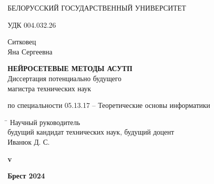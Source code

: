 \begin{titlepage}

    \begin{center} \bfseries
        \bigskip
        \medskip

        {БЕЛОРУССКИЙ ГОСУДАРСТВЕННЫЙ УНИВЕРСИТЕТ}
    \end{center}
    \vspace{1cm}

    \noindent УДК 004.032.26 \\
    \vspace{1cm}

    \begin{center}
        {Ситковец \\ Яна Сергеевна}\\
        \vspace{1cm}

        {\bfseries НЕЙРОСЕТЕВЫЕ МЕТОДЫ АСУТП}\\
        \vspace{2cm}
        Диссертация потенциально будущего\\
        магистра технических наук\\
        \bigskip

        по специальности 05.13.17 -- Теоретические основы информатики
    \end{center}
    \vspace{3cm}

    \begin{tabbing}
        \hspace{8cm} \= \kill \>
        Научный руководитель \+ \\
        будущий кандидат технических наук, будущий доцент\\
        Иванюк Д. С.
    \end{tabbing}


    \ifdefined\dissertationversion
        \vspace{3cm}
        \begin{center}
            \bfseries v\dissertationversion
        \end{center}
        \vspace{3cm}
    \else
        \vspace{7cm}
    \fi

    \begin{center}
        \bfseries Брест 2024
    \end{center}

\end{titlepage}